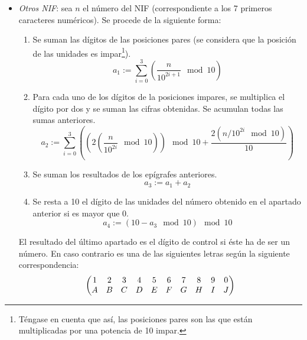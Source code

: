 \documentclass[11pt, a4paper, twoside, titlepage]{article}
\begin{document}
\begin{itemize}
					\item {\itshape Otros NIF}: sea $n$ el número del NIF (correspondiente a los 7 primeros caracteres numéricos). Se procede de la siguiente forma:	
						\begin{enumerate}
							\item Se suman las dígitos de las posiciones pares (se considera que la posición de las unidades es impar\footnote{Téngase en cuenta que así, las posiciones pares son las que están multiplicadas por una potencia de 10 impar.}).
								\begin{equation*}
									a_1 := \sum_{i=0}^3 \left( \frac{n}{10^{2i + 1}} \mod 10 \right)
								\end{equation*}
							\item Para cada uno de los dígitos de la posiciones impares, se multiplica el dígito por dos y se suman las cifras obtenidas. Se acumulan todas las sumas anteriores.
								\begin{equation*}
									a_2 := \sum_{i=0}^3 \left( \left( 2 \left( \frac{n}{10^{2i}} \mod 10\right) \right) \mod 10 + \frac{ 2 \left( n / 10^{2i} \mod 10 \right)}{10} \right)
								\end{equation*}

							\item Se suman los resultados de los epígrafes anteriores.
								\begin{equation*}
									a_3 := a_1 + a_2
								\end{equation*}
							\item Se resta a 10 el dígito de las unidades del número obtenido en el apartado anterior si es mayor que 0.
								\begin{equation*}
									a_4 := (10 - a_3 \mod 10) \mod 10
								\end{equation*}
						\end{enumerate}

	
					El resultado del último apartado es el dígito de control si éste ha de ser un número. En caso contrario es una de las siguientes letras según la siguiente correspondencia:
						{\small
						\begin{equation*}
							\setcounter{MaxMatrixCols}{10}
							\begin{pmatrix}
								1 & 2 & 3 & 4 & 5 & 6 & 7 & 8 & 9 & 0 \\
								A & B & C & D & E & F & G & H & I & J
							\end{pmatrix}
						\end{equation*}
						}
				\end{itemize}
\end{document}
